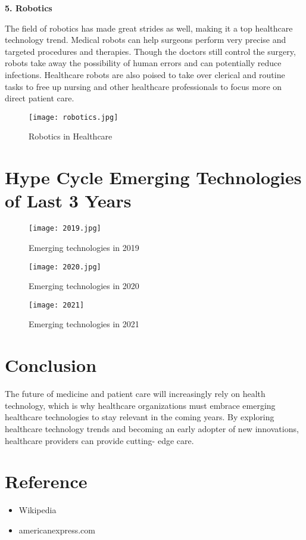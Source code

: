 \documentclass[12pt,a4paper]{article}
\begin{document}
\textbf{5. Robotics}

\hspace{1cm}

The field of robotics has made great strides as well, making it a top healthcare technology trend. Medical robots can help surgeons perform very precise and targeted procedures and therapies. Though the doctors still control the surgery, robots take away the possibility of human errors and can potentially reduce infections. Healthcare robots are also poised to take over clerical and routine tasks to free up nursing and other healthcare professionals to focus more on direct patient care.


\hspace{5cm}

\begin{figure}[h]
\centering
\texttt{[image: robotics.jpg]}
\caption{Robotics in Healthcare}
\end{figure}

\clearpage

\section{Hype Cycle  Emerging Technologies of Last 3 Years}

\hspace{5cm}

\begin{figure}[h]
\centering
\texttt{[image: 2019.jpg]}
\caption{Emerging technologies in 2019}
\end{figure}


\begin{figure}
\centering
\texttt{[image: 2020.jpg]}
\caption{Emerging technologies in 2020}
\end{figure}



\begin{figure}
\centering
\texttt{[image: 2021]}
\caption{Emerging technologies in 2021}
\end{figure}

\clearpage

\section{Conclusion}

\hspace{1cm}

The future of medicine and patient care will increasingly rely on health technology, which is why healthcare organizations must embrace emerging healthcare technologies to stay relevant in the coming years. By exploring healthcare technology trends and becoming an early adopter of new innovations, healthcare providers can provide cutting- edge care.


\section{Reference}

\begin{itemize}
\item Wikipedia
\item americanexpress.com
\end{itemize}
\end{document}
